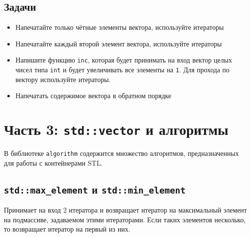 \documentclass{article}
\begin{document}
\subsection*{Задачи}
\begin{itemize}
\item Напечатайте только чётные элементы вектора, используйте итераторы
\item Напечатайте каждый второй элемент вектора, используйте итераторы
\item Напишите функцию \texttt{inc}, которая будет принимать на вход вектор целых чисел типа \texttt{int} и будет увеличивать все элементы на \texttt{1}. Для прохода по вектору используйте итераторы.
\item Напечатать содержимое вектора в обратном порядке
\end{itemize}


\newpage
\section*{Часть 3: \texttt{std::vector} и алгоритмы}
В библиотеке \texttt{algorithm} содержится множество алгоритмов, предназначенных для работы с контейнерами STL.
\subsection*{\texttt{std::max\_element} и \texttt{std::min\_element}}
Принимает на вход 2 итератора и возвращает итератор на максимальный элемент на подмассиве, задаваемом этими итераторами. Если таких элементов несколько, то возвращает итератор на первый из них.
\end{document}
